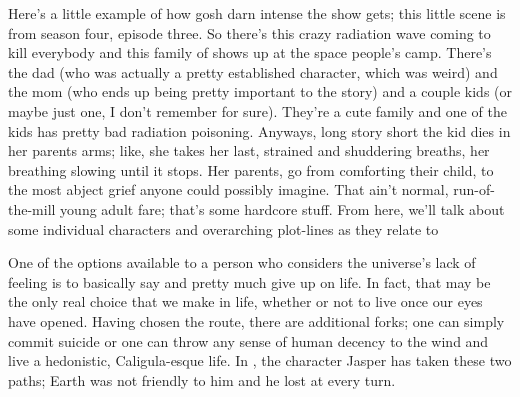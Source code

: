 \documentclass[../butidigress.tex]{subfiles}
\begin{document}
Here's a little example of how gosh darn intense the show gets; this little scene is from season four, episode three.
So there's this crazy radiation wave coming to kill everybody and this family of  shows up at the space people's camp.
There's the dad (who was actually a pretty established character, which was weird) and the mom (who ends up being pretty important to the story) and a couple kids (or maybe just one, I don't remember for sure).
They're a cute family and one of the kids has pretty bad radiation poisoning.
Anyways, long story short the kid dies in her parents arms; like, she takes her last, strained and shuddering breaths, her breathing slowing until it stops.
Her parents, go from comforting their child, to the most abject grief anyone could possibly imagine.
That ain't normal, run-of-the-mill young adult fare; that's some hardcore stuff.
From here, we'll talk about some individual characters and overarching plot-lines as they relate to 

One of the options available to a person who considers the universe's lack of feeling is to basically say  and pretty much give up on life.
In fact, that may be the only real choice that we make in life, whether or not to live once our eyes have opened.\autocite{mythofsisyphus}
Having chosen the  route, there are additional forks; one can simply commit suicide or one can throw any sense of human decency to the wind and live a hedonistic, Caligula-esque life.
In , the character Jasper has taken these two paths; Earth was not friendly to him and he lost at every turn.
\end{document}
